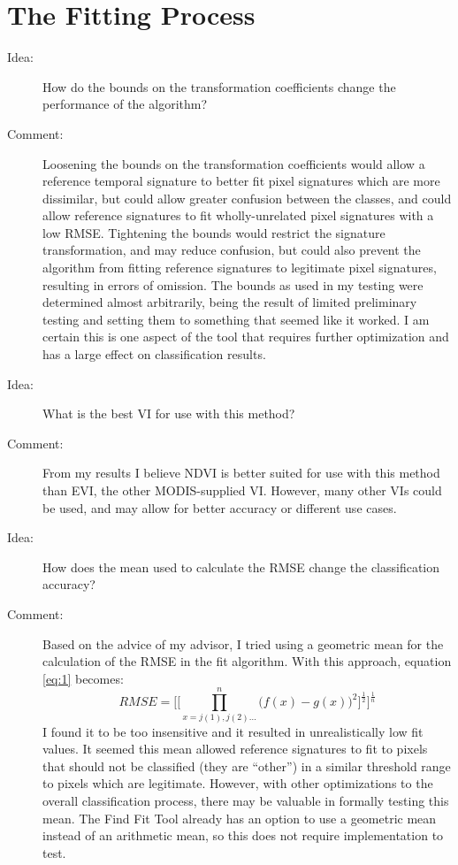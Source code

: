 \section{The Fitting Process}

\begin{description}
\item[Idea:] How do the bounds on the transformation coefficients change the performance of the algorithm?

\item[Comment:] Loosening the bounds on the transformation coefficients would allow a reference temporal signature to better fit pixel signatures which are more dissimilar, but could allow greater confusion between the classes, and could allow reference signatures to fit wholly-unrelated pixel signatures with a low RMSE. Tightening the bounds would restrict the signature transformation, and may reduce confusion, but could also prevent the algorithm from fitting reference signatures to legitimate pixel signatures, resulting in errors of omission. The bounds as used in my testing were determined  almost arbitrarily, being the result of limited preliminary testing and setting them to something that seemed like it worked. I am certain this is one aspect of the tool that requires further optimization and has a large effect on classification results.

\item[Idea:] What is the best VI for use with this method?

\item[Comment:] From my results I believe NDVI is better suited for use with this method than EVI, the other MODIS-supplied VI. However, many other VIs could be used, and may allow for better accuracy or different use cases.

\item[Idea:] How does the mean used to calculate the RMSE change the classification accuracy?

\item[Comment:] Based on the advice of my advisor, I tried using a geometric mean for the calculation of the RMSE in the fit algorithm. With this approach, equation \ref{eq:1} becomes:
\begin{equation}
\label{eq:geometricmean}
  RMSE = \Biggl[\biggl[\prod_{x=j(1), j(2)...}^{n}\bigl(f\left(x\right)-g\left(x\right)\bigr)^{2}\biggr]^{\frac{1}{2}}\Biggr]^{\frac{1}{n}}
\end{equation}
I found it to be too insensitive and it resulted in unrealistically low fit values. It seemed this mean allowed reference signatures to fit to pixels that should not be classified (they are “other”) in a similar threshold range to pixels which are legitimate. However, with other optimizations to the overall classification process, there may be valuable in formally testing this mean. The Find Fit Tool already has an option to use a geometric mean instead of an arithmetic mean, so this does not require implementation to test.


\end{description}
